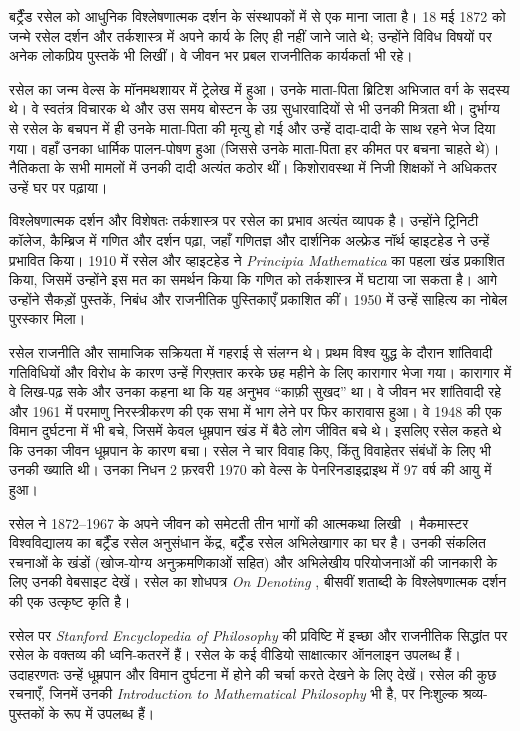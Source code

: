 \documentclass[../../../include/open-logic-section]{subfiles}
\begin{document}



बर्ट्रैंड रसेल को आधुनिक विश्लेषणात्मक दर्शन के संस्थापकों में से एक माना
जाता है। 18 मई 1872 को जन्मे रसेल दर्शन और तर्कशास्त्र में अपने कार्य के
लिए ही नहीं जाने जाते थे; उन्होंने विविध विषयों पर अनेक लोकप्रिय पुस्तकें भी
लिखीं। वे जीवन भर प्रबल राजनीतिक कार्यकर्ता भी रहे।

रसेल का जन्म वेल्स के मॉनमथशायर में ट्रेलेख में हुआ। उनके माता-पिता ब्रिटिश
अभिजात वर्ग के सदस्य थे। वे स्वतंत्र विचारक थे और उस समय बोस्टन के उग्र
सुधारवादियों से भी उनकी मित्रता थी। दुर्भाग्य से रसेल के बचपन में ही उनके
माता-पिता की मृत्यु हो गई और उन्हें दादा-दादी के साथ रहने भेज दिया गया। वहाँ
उनका धार्मिक पालन-पोषण हुआ (जिससे उनके माता-पिता हर कीमत पर बचना चाहते थे)।
नैतिकता के सभी मामलों में उनकी दादी अत्यंत कठोर थीं। किशोरावस्था में निजी
शिक्षकों ने अधिकतर उन्हें घर पर पढ़ाया।

विश्लेषणात्मक दर्शन और विशेषतः तर्कशास्त्र पर रसेल का प्रभाव अत्यंत व्यापक
है। उन्होंने ट्रिनिटी कॉलेज, कैम्ब्रिज में गणित और दर्शन पढ़ा, जहाँ गणितज्ञ
और दार्शनिक अल्फ्रेड नॉर्थ व्हाइटहेड ने उन्हें प्रभावित किया। 1910 में रसेल
और व्हाइटहेड ने \emph{Principia Mathematica} का पहला खंड प्रकाशित किया,
जिसमें उन्होंने इस मत का समर्थन किया कि गणित को तर्कशास्त्र में घटाया जा
सकता है। आगे उन्होंने सैकड़ों पुस्तकें, निबंध और राजनीतिक पुस्तिकाएँ
प्रकाशित कीं। 1950 में उन्हें साहित्य का नोबेल पुरस्कार मिला।

रसेल राजनीति और सामाजिक सक्रियता में गहराई से संलग्न थे। प्रथम विश्व
युद्ध के दौरान शांतिवादी गतिविधियों और विरोध के कारण उन्हें गिरफ़्तार करके
छह महीने के लिए कारागार भेजा गया। कारागार में वे लिख-पढ़ सके और उनका कहना
था कि यह अनुभव ``काफ़ी सुखद'' था। वे जीवन भर शांतिवादी रहे और 1961 में
परमाणु निरस्त्रीकरण की एक सभा में भाग लेने पर फिर कारावास हुआ। वे 1948 की
एक विमान दुर्घटना में भी बचे, जिसमें केवल धूम्रपान खंड में बैठे लोग जीवित
बचे थे। इसलिए रसेल कहते थे कि उनका जीवन धूम्रपान के कारण बचा। रसेल ने चार
विवाह किए, किंतु विवाहेतर संबंधों के लिए भी उनकी ख्याति थी। उनका निधन 2
फ़रवरी 1970 को वेल्स के पेनरिनडाइद्राइथ में 97 वर्ष की आयु में हुआ।

\begin{reading}
रसेल ने 1872--1967 के अपने जीवन को समेटती तीन भागों की आत्मकथा लिखी
\citep{Russell1967,Russell1968,Russell1969}। मैकमास्टर विश्वविद्यालय का
बर्ट्रैंड रसेल अनुसंधान केंद्र, बर्ट्रैंड रसेल अभिलेखागार का घर है। उनकी
संकलित रचनाओं के खंडों (खोज-योग्य अनुक्रमणिकाओं सहित) और अभिलेखीय
परियोजनाओं की जानकारी के लिए उनकी वेबसाइट \citet{Duncan2015} देखें। रसेल
का शोधपत्र \emph{On Denoting} \citep{Russell1905}, बीसवीं शताब्दी के
विश्लेषणात्मक दर्शन की एक उत्कृष्ट कृति है।

रसेल पर \emph{Stanford Encyclopedia of Philosophy} की प्रविष्टि
\citep{Irvine2015} में इच्छा और राजनीतिक सिद्धांत पर रसेल के वक्तव्य की
ध्वनि-कतरनें हैं। रसेल के कई वीडियो साक्षात्कार ऑनलाइन उपलब्ध हैं। उदाहरणतः
उन्हें धूम्रपान और विमान दुर्घटना में होने की चर्चा करते देखने के लिए
\citet{RussellND} देखें। रसेल की कुछ रचनाएँ, जिनमें उनकी
\emph{Introduction to Mathematical Philosophy} भी है, \citet{LibriVoxND}
पर निःशुल्क श्रव्य-पुस्तकों के रूप में उपलब्ध हैं।
\end{reading}
\end{document}
